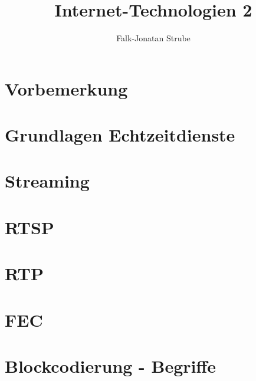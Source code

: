\documentclass{scrreprt}
\title{Internet-Technologien 2}
\author{Falk-Jonatan Strube}
\begin{document}
\maketitle
\tableofcontents

\chapter*{Vorbemerkung}

\chapter{Grundlagen Echtzeitdienste}


\chapter{Streaming}


\chapter{RTSP}


\chapter{RTP}


\chapter{FEC}


\chapter{Blockcodierung - Begriffe}



\end{document}
